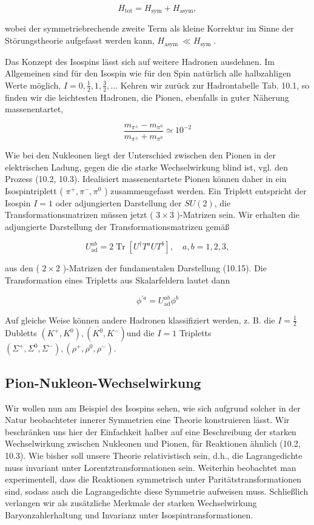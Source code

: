 \documentclass[10pt, letterpaper]{article}
\begin{document}
$$
H_{\mathrm{tot}}=H_{\mathrm{sym}}+H_{\mathrm{asym}},
$$

wobei der symmetriebrechende zweite Term als kleine Korrektur im Sinne der Störungstheorie aufgefasst werden kann, $H_{\text {asym }} \ll H_{\text {sym }}$.

Das Konzept des Isospins lässt sich auf weitere Hadronen ausdehnen. Im Allgemeinen sind für den Isospin wie für den Spin natürlich alle halbzahligen Werte möglich, $I=0, \frac{1}{2}, 1, \frac{3}{2}, \ldots$ Kehren wir zurück zur Hadrontabelle Tab. 10.1, so finden wir die leichtesten Hadronen, die Pionen, ebenfalls in guter Näherung massenentartet,

$$
\frac{m_{\pi^{ \pm}}-m_{\pi^{0}}}{m_{\pi^{ \pm}}+m_{\pi^{0}}} \simeq 10^{-2}
$$

Wie bei den Nukleonen liegt der Unterschied zwischen den Pionen in der elektrischen Ladung, gegen die die starke Wechselwirkung blind ist, vgl. den Prozess (10.2, 10.3). Idealisiert massenentartete Pionen können daher in ein Isospintriplett ( $\pi^{+}, \pi^{-}, \pi^{0}$ ) zusammengefasst werden. Ein Triplett entspricht der Isospin $I=1$ oder adjungierten Darstellung der $S U(2)$, die Transformationsmatrizen müssen jetzt ( $3 \times 3$ )-Matrizen sein. Wir erhalten die adjungierte Darstellung der Transformationsmatrizen gemäß

$$
U_{\mathrm{ad}}^{a b}=2 \operatorname{Tr}\left[U^{\dagger} T^{a} U T^{b}\right], \quad a, b=1,2,3,
$$

aus den ( $2 \times 2$ )-Matrizen der fundamentalen Darstellung (10.15). Die Transformation eines Tripletts aus Skalarfeldern lautet dann

$$
\phi^{\prime a}=U_{\mathrm{ad}}^{a b} \phi^{b}
$$

Auf gleiche Weise können andere Hadronen klassifiziert werden, z. B. die $I=\frac{1}{2}$ Dubletts $\left(K^{+}, K^{0}\right),\left(\overline{K^{0}}, K^{-}\right)$und die $I=1$ Tripletts $\left(\Sigma^{+}, \Sigma^{0}, \Sigma^{-}\right),\left(\rho^{+}, \rho^{0}, \rho^{-}\right)$.

\subsection*{Pion-Nukleon-Wechselwirkung}
Wir wollen nun am Beispiel des Isospins sehen, wie sich aufgrund solcher in der Natur beobachteter innerer Symmetrien eine Theorie konstruieren lässt. Wir beschränken uns hier der Einfachkeit halber auf eine Beschreibung der starken Wechselwirkung zwischen Nukleonen und Pionen, für Reaktionen ähnlich (10.2, 10.3). Wie bisher soll unsere Theorie relativistisch sein, d.h., die Lagrangedichte muss invariant unter Lorentztransformationen sein. Weiterhin beobachtet man experimentell, dass die Reaktionen symmetrisch unter Paritätstransformationen sind, sodass auch die Lagrangedichte diese Symmetrie aufweisen muss. Schließlich verlangen wir als zusätzliche Merkmale der starken Wechselwirkung Baryonzahlerhaltung und Invarianz unter Isospintransformationen.
\end{document}
